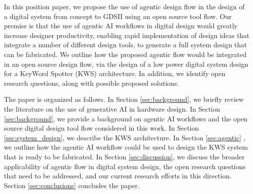In this position paper, we propose the use of agentic design flow in the design of a digital system from concept to GDSII using an open source tool flow. Our premise is that the use of agentic AI workflows in digital design would greatly increase designer productivity, enabling rapid implementation of design ideas that integrate a number of different design tools, to generate a full system design that can be fabricated. We outline how the proposed agentic flow would be integrated in an open source design flow, via the design of a low power digital system design for a KeyWord Spotter (KWS) architecture. In addition, we identify open research questions, along with possible proposed solutions. 

The paper is organized as follows. In Section \ref{sec:background}, we briefly review the literature on the use of generative AI in hardware design. In Section \ref{sec:background}, we provide a background on agentic AI workflows and the open source digital design tool flow considered in this work. In Section \ref{sec:system_design}, we describe the KWS architecture. In Section \ref{sec:agentic} , we outline how the agentic AI workflow could be used to design the KWS system that is ready to be fabricated. In Section \ref{sec:discussion}, we discuss the broader applicability of agentic flow in digital system design, the open research questions that need to be addressed, and our current research efforts in this direction. Section \ref{sec:conclusions} concludes the paper.

